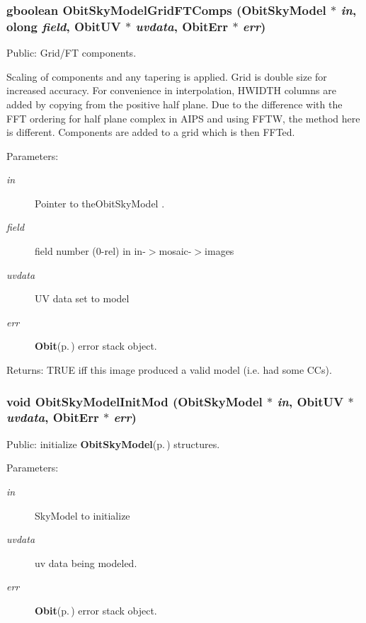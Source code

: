 \subsubsection{\setlength{\rightskip}{0pt plus 5cm}gboolean Obit\-Sky\-Model\-Grid\-FTComps ({\bf Obit\-Sky\-Model} $\ast$ {\em in}, {\bf olong} {\em field}, {\bf Obit\-UV} $\ast$ {\em uvdata}, {\bf Obit\-Err} $\ast$ {\em err})}\label{ObitSkyModel_8h_a75}


Public: Grid/FT components. 

Scaling of components and any tapering is applied. Grid is double size for increased accuracy. For convenience in interpolation, HWIDTH columns are added by copying from the positive half plane. Due to the difference with the FFT ordering for half plane complex in AIPS and using FFTW, the method here is different. Components are added to a grid which is then FFTed. \begin{Desc}
\item[Parameters:]
\begin{description}
\item[{\em in}]Pointer to the\-Obit\-Sky\-Model . \item[{\em field}]field number (0-rel) in in-$>$mosaic-$>$images \item[{\em uvdata}]UV data set to model \item[{\em err}]{\bf Obit}{\rm (p.\,\pageref{structObit})} error stack object. \end{description}
\end{Desc}
\begin{Desc}
\item[Returns:]TRUE iff this image produced a valid model (i.e. had some CCs). \end{Desc}
\subsubsection{\setlength{\rightskip}{0pt plus 5cm}void Obit\-Sky\-Model\-Init\-Mod ({\bf Obit\-Sky\-Model} $\ast$ {\em in}, {\bf Obit\-UV} $\ast$ {\em uvdata}, {\bf Obit\-Err} $\ast$ {\em err})}\label{ObitSkyModel_8h_a51}


Public: initialize {\bf Obit\-Sky\-Model}{\rm (p.\,\pageref{structObitSkyModel})} structures. 

\begin{Desc}
\item[Parameters:]
\begin{description}
\item[{\em in}]Sky\-Model to initialize \item[{\em uvdata}]uv data being modeled. \item[{\em err}]{\bf Obit}{\rm (p.\,\pageref{structObit})} error stack object. \end{description}
\end{Desc}
